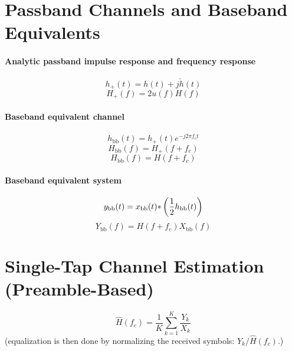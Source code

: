 \section*{Passband Channels and Baseband Equivalents}

\paragraph{Analytic passband impulse response and frequency response}
\begin{equation}
h_{+}(t) = h(t) + j \check{h}(t)
\label{eq:analyticPassbandTimeDomain}
\end{equation}
\begin{equation}
H_{+}(f) = 2 u(f) H(f)
\label{eq:analyticPassbandFrequencyDomain}
\end{equation}

\paragraph{Baseband equivalent channel}
\begin{equation}
h_{\textrm{bb}}(t) = h_{+}(t) e^{-j 2 \pi f_c t}
\label{eq:basebandEquivalentTimeDomain}
\end{equation}
\begin{equation}
H_{\textrm{bb}}(f) = H_{+}(f + f_c)
\label{eq:basebandEquivalentFreqDomain1}
\end{equation}
\begin{equation}
H_{\textrm{bb}}(f) = H(f + f_c)
\label{eq:eq:basebandEquivalentFreqDomain2}
\end{equation}

\paragraph{Baseband equivalent system}
\begin{equation}
y_{\textrm{bb}}(t) = x_{\textrm{bb}}(t) {\ast} \left( \frac{1}{2} h_{\textrm{bb}}(t) \right)
\end{equation}
\begin{equation}
Y_{\textrm{bb}}(f) = H(f+f_c) X_{\textrm{bb}}(f)
\end{equation}

\section*{Single-Tap Channel Estimation (Preamble-Based)}
\begin{equation}
\hat H(f_c) = \frac{1}{K} \sum_{k=1}^K \frac{Y_k}{X_k}
\end{equation}
(equalization is then done by normalizing the received symbols: $Y_k / \hat H(f_c)$.)
